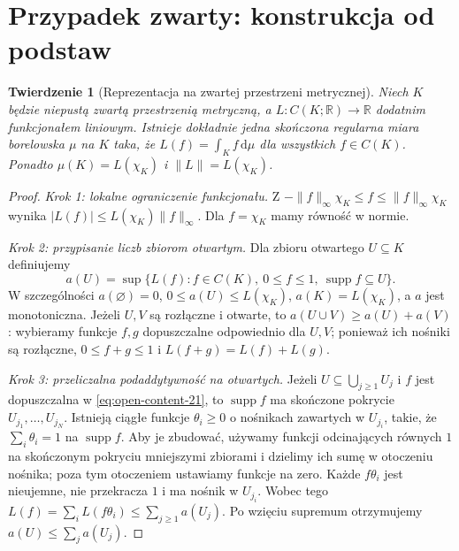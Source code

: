 \documentclass[11pt,a4paper,oneside]{book}
\numberwithin{equation}{chapter}
\theoremstyle{plain}
\newtheorem{twierdzenie}{Twierdzenie}[chapter]
\theoremstyle{definition}
\theoremstyle{remark}
\begin{document}
\section{Przypadek zwarty: konstrukcja od podstaw}
\begin{twierdzenie}[Reprezentacja na zwartej przestrzeni metrycznej]
\label{thm:compact-riesz-21}
Niech $K$ będzie niepustą zwartą przestrzenią metryczną,
a $L:C(K;\mathbb R)\to\mathbb R$ dodatnim funkcjonałem
liniowym. Istnieje dokładnie jedna skończona regularna
miara borelowska $\mu$ na $K$ taka, że
$L(f)=\int_Kf\,\mathrm d\mu$ dla wszystkich $f\in C(K)$.
Ponadto $\mu(K)=L(\chi_K)$ i
$\|L\|=L(\chi_K)$.
\end{twierdzenie}
\begin{proof}
\emph{Krok 1: lokalne ograniczenie funkcjonału.}
Z $-\|f\|_\infty\chi_K\le f\le\|f\|_\infty\chi_K$
wynika $|L(f)|\le L(\chi_K)\|f\|_\infty$.
Dla $f=\chi_K$ mamy równość w normie.

\emph{Krok 2: przypisanie liczb zbiorom otwartym.}
Dla zbioru otwartego $U\subseteq K$ definiujemy
\begin{equation}\label{eq:open-content-21}
 a(U)=\sup\{L(f): f\in C(K),\ 0\le f\le1,\
          \operatorname{supp}f\subseteq U\}.
\end{equation}
W szczególności $a(\varnothing)=0$,
$0\le a(U)\le L(\chi_K)$, $a(K)=L(\chi_K)$,
a $a$ jest monotoniczna. Jeżeli $U,V$ są rozłączne
i otwarte, to $a(U\cup V)\ge a(U)+a(V)$:
wybieramy funkcje $f,g$ dopuszczalne odpowiednio dla
$U,V$; ponieważ ich nośniki są rozłączne,
$0\le f+g\le1$ i $L(f+g)=L(f)+L(g)$.

\emph{Krok 3: przeliczalna podaddytywność na otwartych.}
Jeżeli $U\subseteq\bigcup_{j\ge1}U_j$ i $f$ jest
dopuszczalna w \eqref{eq:open-content-21}, to
$\operatorname{supp}f$ ma skończone pokrycie
$U_{j_1},\ldots,U_{j_N}$. Istnieją ciągłe funkcje
$\theta_i\ge0$ o nośnikach zawartych w $U_{j_i}$,
takie, że $\sum_i\theta_i=1$ na
$\operatorname{supp}f$. Aby je zbudować, używamy
funkcji odcinających równych $1$ na skończonym
pokryciu mniejszymi zbiorami i dzielimy ich sumę
w otoczeniu nośnika; poza tym otoczeniem ustawiamy
funkcje na zero. Każde $f\theta_i$ jest nieujemne,
nie przekracza $1$ i ma nośnik w $U_{j_i}$.
Wobec tego
$L(f)=\sum_i L(f\theta_i)\le\sum_{j\ge1}a(U_j)$.
Po wzięciu supremum otrzymujemy
$a(U)\le\sum_j a(U_j)$.


\end{proof}
\end{document}
